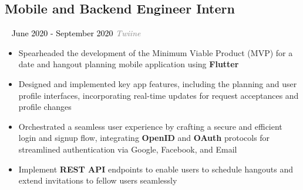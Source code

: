 \documentclass{article}
\newcommand{\resumesection}[3]{
    \subsection*{#1}
    \ 
    \normalsize
    \normalsize
    \hfill
    \textcolor{black}{#3}
    \normalsize
    \newline
    \small
    \textcolor{grey}{\emph{#2}}
}
\begin{document}
\resumesection{Mobile and Backend Engineer Intern}{Twiine}{June 2020 - September 2020}
\begin{itemize}
    \item Spearheaded the development of the Minimum Viable Product (MVP) for a date and hangout planning mobile application using \textbf{Flutter}
    \item Designed and implemented key app features, including the planning and user profile interfaces, incorporating real-time updates for request acceptances and profile changes
    \item Orchestrated a seamless user experience by crafting a secure and efficient login and signup flow, integrating \textbf{OpenID} and \textbf{OAuth} protocols for streamlined authentication via Google, Facebook, and Email
    \item Implement \textbf{REST API} endpoints to enable users to schedule hangouts and extend invitations to fellow users seamlessly
\end{itemize}
\end{document}
